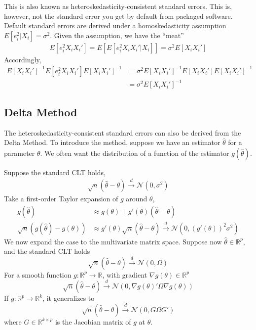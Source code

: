 \documentclass[12pt]{article}
\begin{document}
This is also known as heteroskedasticity-consistent standard errors. This is, however, not the standard error you get by default from packaged software. Default standard errors are derived under a homoskedasticity assumption $E[e_i^2|X_i]=\sigma^2$. Given the assumption, we have the ``meat''
\begin{align*}
    E[e_i^2X_iX_i'] = E[E[e_i^2X_iX_i' | X_i]] = \sigma^2E[X_iX_i']
\end{align*}
Accordingly, 
\begin{align*}
    E[X_iX_i']^{-1}E[e_i^2 X_i X_i'] E[X_iX_i']^{-1} &= \sigma^2 E[X_iX_i']^{-1}E[X_i X_i'] E[X_iX_i']^{-1} \\
    &= \sigma^2E[X_iX_i']^{-1}
\end{align*}

\newpage
\subsection{Delta Method}

The heteroskedasticity-consistent standard errors can also be derived from the Delta Method. To introduce the method, suppose we have an estimator $\hat{\theta}$ for a parameter $\theta$. We often want the distribution of a function of the estimator $g(\hat{\theta})$.

Suppose the standard CLT holds,
\begin{align*}
    \sqrt{n}(\hat{\theta} - \theta) \xrightarrow{d} \mathcal{N}(0,\sigma^2)
\end{align*}
Take a first-order Taylor expansion of $g$ around $\theta$,
\begin{align*}
    g(\hat{\theta}) &\approx g(\theta) + g'(\theta)(\hat{\theta}-\theta) \\
    \sqrt{n}(g(\hat{\theta}) - g(\theta)) &\approx g'(\theta)\sqrt{n}(\hat{\theta}-\theta) \xrightarrow{d} \mathcal{N}(0,(g'(\theta))^2\sigma^2)
\end{align*}
We now expand the case to the multivariate matrix space. Suppose now $\hat{\theta} \in \mathbb{R}^{p}$, and the standard CLT holds
$$
\sqrt{n}(\hat{\theta} - \theta) \xrightarrow{d} \mathcal{N}(0,\Omega)
$$
For a smooth function $g: \mathbb{R}^{p} \rightarrow \mathbb{R}$, with gradient $\nabla g(\theta) \in \mathbb{R}^p$
$$
\sqrt{n}(\hat{\theta} - \theta) \xrightarrow{d} \mathcal{N}(0, \nabla g(\theta)' \Omega \nabla g(\theta))
$$
If $g: \mathbb{R}^{p} \rightarrow \mathbb{R}^k$, it generalizes to
$$
\sqrt{n}(\hat{\theta} - \theta) \xrightarrow{d} \mathcal{N}(0, G \Omega G')
$$
where $G \in \mathbb{R}^{k \times p}$ is the Jacobian matrix of $g$ at $\theta$.
\end{document}
